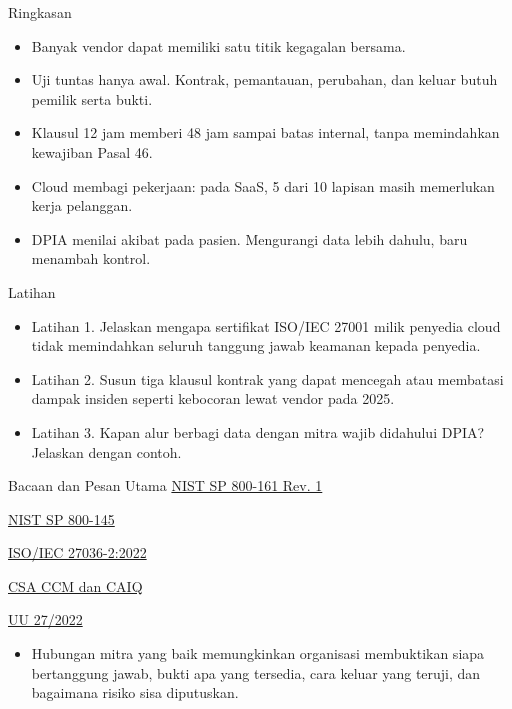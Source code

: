 \documentclass[aspectratio=169, table, 12pt]{beamer}
\begin{document}
\begin{frame}{{\Large Ringkasan}}
  \vspace{6pt}
  \small
  \begin{itemize}
    \item Banyak vendor dapat memiliki satu titik kegagalan bersama.
    \item Uji tuntas hanya awal. Kontrak, pemantauan, perubahan, dan keluar butuh pemilik serta
          bukti.
    \item Klausul 12 jam memberi 48 jam sampai batas internal, tanpa memindahkan kewajiban Pasal 46.
    \item Cloud membagi pekerjaan: pada SaaS, 5 dari 10 lapisan masih memerlukan kerja pelanggan.
    \item DPIA menilai akibat pada pasien. Mengurangi data lebih dahulu, baru menambah kontrol.
  \end{itemize}
\end{frame}

\begin{frame}{{\Large Latihan}}
  \vspace{6pt}
  \small
  \begin{itemize}
    \item Latihan 1. Jelaskan mengapa sertifikat ISO/IEC 27001 milik penyedia cloud tidak
          memindahkan seluruh tanggung jawab keamanan kepada penyedia.
    \item Latihan 2. Susun tiga klausul kontrak yang dapat mencegah atau membatasi dampak insiden
          seperti kebocoran lewat vendor pada 2025.
    \item Latihan 3. Kapan alur berbagi data dengan mitra wajib didahului DPIA? Jelaskan dengan
          contoh.
  \end{itemize}
\end{frame}

\begin{frame}{{\Large Bacaan dan Pesan Utama}}
  \vspace{4pt}
  \small
  \href{https://doi.org/10.6028/NIST.SP.800-161r1-upd1}{NIST SP 800-161 Rev. 1}\par
  \href{https://doi.org/10.6028/NIST.SP.800-145}{NIST SP 800-145}\par
  \href{https://www.iso.org/standard/82060.html}{ISO/IEC 27036-2:2022}\par
  \href{https://cloudsecurityalliance.org/research/cloud-controls-matrix}{CSA CCM dan CAIQ}\par
  \href{https://peraturan.bpk.go.id/Details/229798/uu-no-27-tahun-2022}{UU 27/2022}\par
  \vspace{8pt}
  \begin{itemize}
    \item Hubungan mitra yang baik memungkinkan organisasi membuktikan siapa bertanggung jawab,
          bukti apa yang tersedia, cara keluar yang teruji, dan bagaimana risiko sisa diputuskan.
  \end{itemize}
\end{frame}
\end{document}
